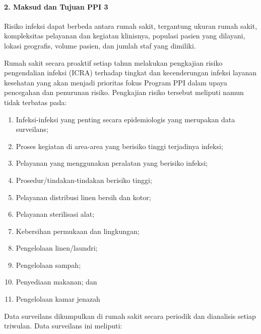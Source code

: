 \documentclass[
]{book}
\providecommand{\tightlist}{%
  \setlength{\itemsep}{0pt}\setlength{\parskip}{0pt}}
\begin{document}
\hypertarget{maksud-dan-tujuan-ppi-3}{%
\paragraph*{2. Maksud dan Tujuan PPI 3}\label{maksud-dan-tujuan-ppi-3}}

Risiko infeksi dapat berbeda antara rumah sakit, tergantung ukuran rumah sakit, kompleksitas pelayanan dan kegiatan klinisnya, populasi pasien yang dilayani, lokasi geografis, volume pasien, dan jumlah staf yang dimiliki.

Rumah sakit secara proaktif setiap tahun melakukan pengkajian risiko pengendalian infeksi (ICRA) terhadap tingkat dan kecenderungan infeksi layanan kesehatan yang akan menjadi prioritas fokus Program PPI dalam upaya pencegahan dan penurunan risiko. Pengkajian risiko tersebut meliputi namun tidak terbatas pada:

\begin{enumerate}
\def\labelenumi{\alph{enumi}.}
\tightlist
\item
  Infeksi-infeksi yang penting secara epidemiologis yang merupakan data surveilans;
\item
  Proses kegiatan di area-area yang berisiko tinggi terjadinya infeksi;
\item
  Pelayanan yang menggunakan peralatan yang berisiko infeksi;
\item
  Prosedur/tindakan-tindakan berisiko tinggi;
\item
  Pelayanan distribusi linen bersih dan kotor;
\item
  Pelayanan sterilisasi alat;
\item
  Kebersihan permukaan dan lingkungan;
\item
  Pengelolaan linen/laundri;
\item
  Pengelolaan sampah;
\item
  Penyediaan makanan; dan
\item
  Pengelolaan kamar jenazah
\end{enumerate}

Data surveilans dikumpulkan di rumah sakit secara periodik dan dianalisis setiap triwulan. Data surveilans ini meliputi:
\end{document}
